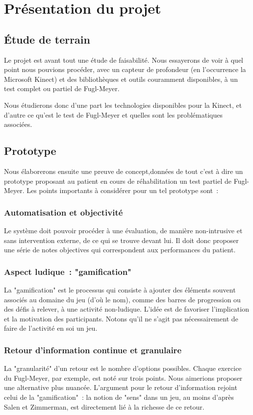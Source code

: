 \documentclass[french,12pt]{report}
\begin{document}
		\section{Présentation du projet}
		
			\subsection{Étude de terrain} \label{etude_terrain}
		Le projet est avant tout une étude de faisabilité. Nous essayerons de voir
		à quel point nous pouvions procéder, avec un capteur de profondeur (en
		l'occurrence la Microsoft Kinect) et des bibliothèques et outils couramment 
		disponibles, à un test complet ou partiel de Fugl-Meyer.
		
		Nous étudierons donc d'une part les technologies disponibles pour la Kinect,
		et d'autre ce qu'est le test de Fugl-Meyer et quelles sont les 
		problématiques associées.
		
		\subsection{Prototype}
		Nous élaborerons ensuite une preuve de concept,données de tout c'est à dire un 
		prototype proposant au patient en cours de réhabilitation un test partiel 
		de Fugl-Meyer. Les points importants à considérer pour un tel prototype 
		sont~:
		\subsubsection{Automatisation et objectivité}
		Le système doit pouvoir procéder à une évaluation, de manière non-intrusive 
		et sans intervention externe, de ce qui se trouve devant lui. Il doit donc 
		proposer une série de notes objectives qui correspondent aux performances du 
		patient.
		\subsubsection{Aspect ludique~: "gamification"}
		La "gamification" est le processus qui consiste à ajouter des éléments 
		souvent associés au domaine du jeu (d'où le nom), comme des barres de
		progression ou des défis à relever, à une activité non-ludique. L'idée est 
		de favoriser l'implication et la motivation des participants. 
		Notons qu'il ne s'agit pas nécessairement de faire de l'activité en soi un 
		jeu.
    \subsubsection{Retour d'information continue et granulaire}
    La "granularité" d'un retour est le nombre d'options possibles. 
    Chaque exercice du Fugl-Meyer, par exemple, est noté sur trois points. Nous 
    aimerions proposer une alternative plus nuancée.
    L'argument pour le retour d'information rejoint celui de la "gamification"~:
    la notion de "sens" dans un jeu, au moins d'après Salen et Zimmerman, est 
    directement lié à la richesse de ce retour.
    
\end{document}
